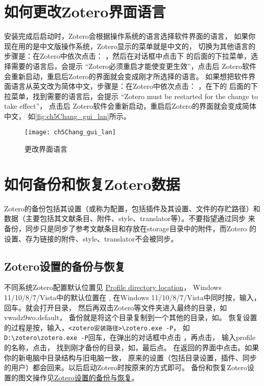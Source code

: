 \documentclass[theorem=false,mathfont=none,openany,sub3section]{easybook}
\begin{document}
\section{如何更改Zotero界面语言} \label{sec:chang_gui_lan}
安装完成后启动时，Zotero会根据操作系统的语言选择软件界面的语言，
如果你现在用的是中文版操作系统，Zotero显示的菜单就是中文的，
切换为其他语言的步骤是：在Zotero中依次点击：
，然后在对话框中点击下
的后面的下拉菜单，选择需要的语言后，会提示
“Zotero必须重启才能使变更生效”，点击后
Zotero软件会重新启动，重启后Zotero的界面就会变成刚才所选择的语言。
如果想把软件界面语言从英文改为简体中文，步骤是：在Zotero中依次点击：
，在下的
后面的下拉菜单，找到需要的语言后，会提示
“Zotero must be restarted for the change to take effect”，
点击后
Zotero软件会重新启动，重启后Zotero的界面就会变成简体中文，	如\autoref{fig:ch5Chang_gui_lan}所示。

\begin{figure}[htbp]
	\centering
	\texttt{[image: ch5Chang\_gui\_lan]}
	\caption{更改界面语言}
	\label{fig:ch5Chang_gui_lan}
\end{figure}

\section{如何备份和恢复Zotero数据} \label{sec:back}
Zotero的备份包括其设置（或称为配置，包括插件及其设置、文件的存贮路径）和
数据（主要包括其文献条目、附件、style、translator等）。不要指望通过同步
来备份，同步只是同步了参考文献条目和存放在storage目录中的附件，而Zotero
的设置、存为链接的附件、style、translator不会被同步。

\subsection{Zotero设置的备份与恢复}
不同系统Zotero配置默认位置见
\href{https://www.zotero.org/support/kb/profile_directory}{Profile directory location}，
Windows 11/10/8/7/Vista中的默认位置在
,
在Windows 11/10/8/7/Vista中同时按，输入，回车。就会打开目录，
然后再双击Zotero等文件夹进入最终的目录，如vwadz9wo.default，
备份就是将这个目录复制到一个其他的目录，如。
恢复设置的过程是按，输入，\verb|<zotero安装路径>\zotero.exe -P|，
如 \verb|D:\zotero\zotero.exe -P|回车，在弹出的对话框中点击
，再点击，
输入profile的名称，点击，
找到刚才备份的目录，如，最后点。
在返回的界面中点击。如果你的新电脑中目录结构与旧电脑一致，
原来的设置（包括目录设置，插件、同步的用户）都会回来。以后启动Zotero时按原来的方式即可。
备份和恢复Zotero设置的图文操作见\href{https://zhuanlan.zhihu.com/p/350546813}
{Zotero设置的备份与恢复}。
\end{document}
